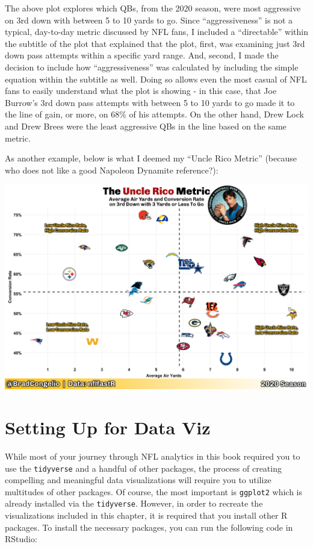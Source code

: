 \documentclass[
  letterpaper,
]{krantz}
\begin{document}
The above plot explores which QBs, from the 2020 season, were most
aggressive on 3rd down with between 5 to 10 yards to go. Since
``aggressiveness'' is not a typical, day-to-day metric discussed by NFL
fans, I included a ``directable'' within the subtitle of the plot that
explained that the plot, first, was examining just 3rd down pass
attempts within a specific yard range. And, second, I made the decision
to include how ``aggressiveness'' was calculated by including the simple
equation within the subtitle as well. Doing so allows even the most
casual of NFL fans to easily understand what the plot is showing - in
this case, that Joe Burrow's 3rd down pass attempts with between 5 to 10
yards to go made it to the line of gain, or more, on 68\% of his
attempts. On the other hand, Drew Lock and Drew Brees were the least
aggressive QBs in the line based on the same metric.

As another example, below is what I deemed my ``Uncle Rico Metric''
(because who does not like a good Napoleon Dynamite reference?):

\includegraphics[width=1\textwidth,height=\textheight]{./images/unclerico.png}

\hypertarget{setting-up-for-data-viz}{%
\section{Setting Up for Data Viz}\label{setting-up-for-data-viz}}

While most of your journey through NFL analytics in this book required
you to use the \texttt{tidyverse} and a handful of other packages, the
process of creating compelling and meaningful data visualizations will
require you to utilize multitudes of other packages. Of course, the most
important is \texttt{ggplot2} which is already installed via the
\texttt{tidyverse}. However, in order to recreate the visualizations
included in this chapter, it is required that you install other R
packages. To install the necessary packages, you can run the following
code in RStudio:
\end{document}
